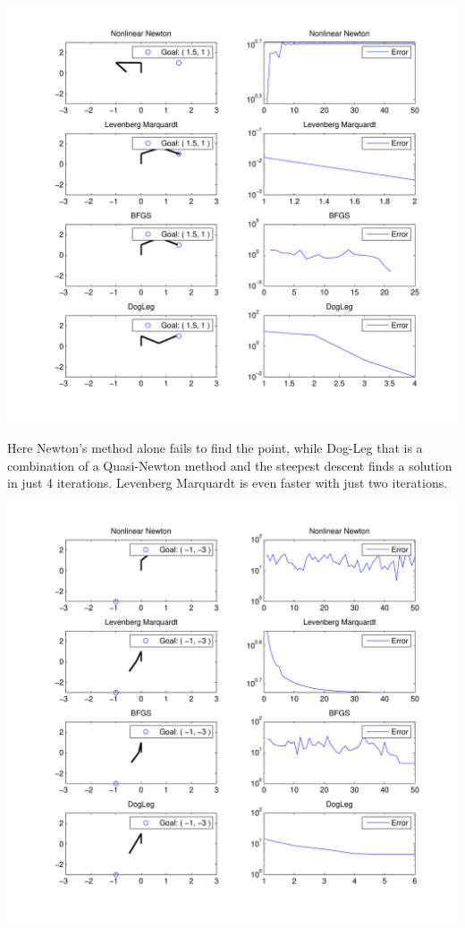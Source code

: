 \documentclass[10pt,oneside,a4paper,final,english]{memoir}
\begin{document}
\begin{center}
\includegraphics[width=\textwidth]{images/graph1.pdf}
\end{center}

Here Newton's method alone fails to find the point, while Dog-Leg that
is a combination of a Quasi-Newton method and the steepest descent
finds a solution in just 4 iterations. Levenberg Marquardt is even
faster with just two iterations.


\begin{center}
\includegraphics[width=\textwidth]{images/graph3.pdf}
\end{center}
\end{document}
